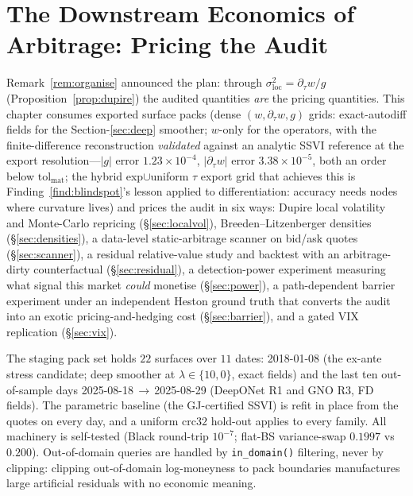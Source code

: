 \chapter{The Downstream Economics of Arbitrage: Pricing the Audit}\label{ch:downstream}

Remark~\ref{rem:organise} announced the plan: through
$\sigma_{\mathrm{loc}}^2=\partial_\tau w/g$ (Proposition~\ref{prop:dupire}) the audited
quantities \emph{are} the pricing quantities. This chapter consumes exported surface packs
(dense $(w,\partial_\tau w,g)$ grids: exact-autodiff fields for the Section-\ref{sec:deep}
smoother; $w$-only for the operators, with the finite-difference reconstruction
\emph{validated} against an analytic SSVI reference at the export resolution---$|g|$ error
$1.23\times10^{-4}$, $|\partial_\tau w|$ error $3.38\times10^{-5}$, both an order below
$\mathrm{tol}_{\mathrm{mat}}$; the hybrid exp$\cup$uniform $\tau$ export grid that achieves
this is Finding~\ref{find:blindspot}'s lesson applied to differentiation: accuracy needs
nodes where curvature lives) and prices the audit in six ways: Dupire local volatility and
Monte-Carlo repricing (\S\ref{sec:localvol}), Breeden--Litzenberger densities
(\S\ref{sec:densities}), a data-level static-arbitrage scanner on bid/ask quotes
(\S\ref{sec:scanner}), a residual relative-value study and backtest with an arbitrage-dirty
counterfactual (\S\ref{sec:residual}), a detection-power experiment measuring what signal
this market \emph{could} monetise (\S\ref{sec:power}), a path-dependent barrier experiment
under an independent Heston ground truth that converts the audit into an exotic
pricing-and-hedging cost (\S\ref{sec:barrier}), and a gated VIX replication
(\S\ref{sec:vix}).

The staging pack set holds $22$ surfaces over $11$ dates: 2018-01-08 (the ex-ante stress
candidate; deep smoother at $\lambda\in\{10,0\}$, exact fields) and the last ten
out-of-sample days 2025-08-18\,$\to$\,2025-08-29 (DeepONet R1 and GNO R3, FD fields). The
parametric baseline (the GJ-certified SSVI) is refit in place from the quotes on every day,
and a uniform $\mathrm{crc32}$ hold-out applies to every family. All machinery is self-tested
(Black round-trip $10^{-7}$; flat-BS variance-swap $0.1997$ vs $0.200$). Out-of-domain
queries are handled by \texttt{in\_domain()} filtering, never by clipping: clipping
out-of-domain log-moneyness to pack boundaries manufactures large artificial residuals with
no economic meaning.

